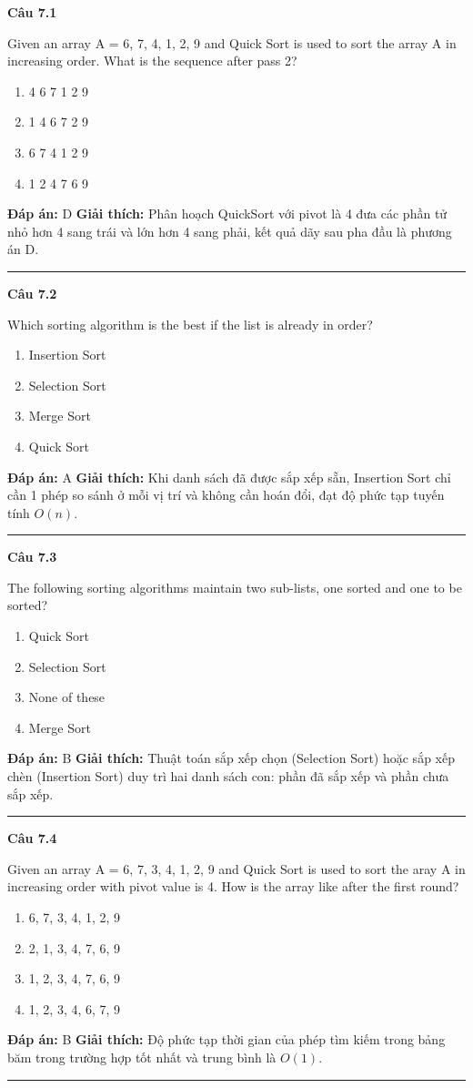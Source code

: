 \documentclass[11pt,a4paper]{article}
\newenvironment{question}[1]{%
  \par\vspace{1em}\noindent\textbf{\large Câu #1}\par\vspace{0.4em}
}{%
  \par\vspace{1em}\hrule\vspace{0.6em}
}
\newenvironment{choices}{%
  \begin{enumerate}[label=\textbf{\Alph*.},leftmargin=2.2em,itemsep=2pt,topsep=3pt]
}{%
  \end{enumerate}
}
\newcommand{\choice}{\item}
\begin{document}
\begin{question}{7.1}
Given an array A = 6, 7, 4, 1, 2, 9 and Quick Sort is used to sort the array A in increasing order. What is the sequence after pass 2?
\begin{choices}
\choice 4 6 7 1 2 9
\choice 1 4 6 7 2 9
\choice 6 7 4 1 2 9
\choice 1 2 4 7 6 9
\end{choices}
\textbf{Đáp án:} D
\textbf{Giải thích:} Phân hoạch QuickSort với pivot là 4 đưa các phần tử nhỏ hơn 4 sang trái và lớn hơn 4 sang phải, kết quả dãy sau pha đầu là phương án D.
\end{question}

\begin{question}{7.2}
Which sorting algorithm is the best if the list is already in order?
\begin{choices}
\choice Insertion Sort
\choice Selection Sort
\choice Merge Sort
\choice Quick Sort
\end{choices}
\textbf{Đáp án:} A
\textbf{Giải thích:} Khi danh sách đã được sắp xếp sẵn, Insertion Sort chỉ cần 1 phép so sánh ở mỗi vị trí và không cần hoán đổi, đạt độ phức tạp tuyến tính \(O(n)\).
\end{question}

\begin{question}{7.3}
The following sorting algorithms maintain two sub-lists, one sorted and one to be sorted?
\begin{choices}
\choice Quick Sort
\choice Selection Sort
\choice None of these
\choice Merge Sort
\end{choices}
\textbf{Đáp án:} B
\textbf{Giải thích:} Thuật toán sắp xếp chọn (Selection Sort) hoặc sắp xếp chèn (Insertion Sort) duy trì hai danh sách con: phần đã sắp xếp và phần chưa sắp xếp.
\end{question}

\begin{question}{7.4}
Given an array A = 6, 7, 3, 4, 1, 2, 9 and Quick Sort is used to sort the aray A in increasing order with pivot value is 4. How is the array like after the first round?
\begin{choices}
\choice 6, 7, 3, 4, 1, 2, 9
\choice 2, 1, 3, 4, 7, 6, 9
\choice 1, 2, 3, 4, 7, 6, 9
\choice 1, 2, 3, 4, 6, 7, 9
\end{choices}
\textbf{Đáp án:} B
\textbf{Giải thích:} Độ phức tạp thời gian của phép tìm kiếm trong bảng băm trong trường hợp tốt nhất và trung bình là \(O(1)\).
\end{question}
\end{document}
